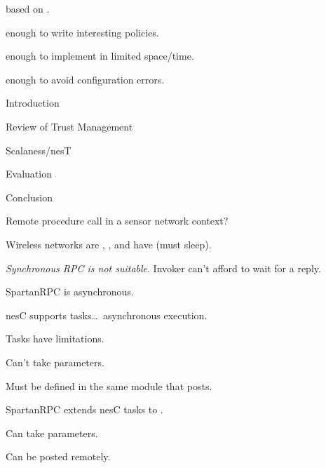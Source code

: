 
\begin{citemize}
\item {} based on \datalog.
\item {} enough to write interesting policies.
\item {} enough to implement in limited space/time.
\item {} enough to avoid configuration errors.
\end{citemize}
\stopslide


\begin{cenumerate}
\item Introduction
\item Review of Trust Management
\item {}
\item Scalaness/nesT
\item Evaluation
\item Conclusion
\end{cenumerate}
\stopslide


Remote procedure call in a sensor network context?

\begin{citemize}
\item Wireless networks are , , and have 
  (must sleep).
\item \emph{Synchronous RPC is not suitable}. Invoker can't afford to wait for a reply.
\item SpartanRPC is asynchronous.
\end{citemize}
\stopslide


\begin{citemize}
\item nesC supports tasks\ldots\ asynchronous execution.
\item Tasks have limitations.
\begin{citemize}
  \item Can't take parameters.
  \item Must be defined in the same module that posts.
\end{citemize}
\item SpartanRPC extends nesC tasks to .
\begin{citemize}
  \item Can take parameters.
  \item Can be posted remotely.
\end{citemize}
\end{citemize}
\stopslide

